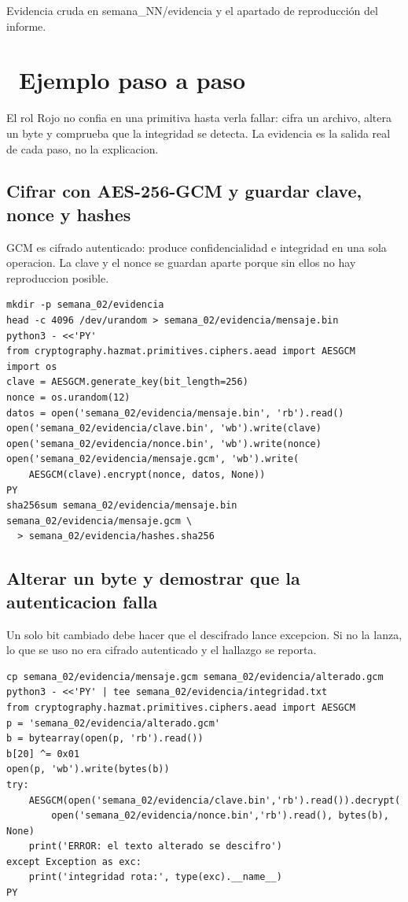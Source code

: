 \documentclass[11pt,a4paper]{article}
\newcommand{\iconotexto}[2]{\textcolor{cyanNeon}{\faIcon{#1}}~#2}
\begin{document}
Evidencia cruda en semana\_NN/evidencia y el apartado de reproducción del informe.

\section{\iconotexto{list-ol}{Ejemplo paso a paso}}

El rol Rojo no confia en una primitiva hasta verla fallar: cifra un archivo, altera un byte y comprueba que la integridad se detecta. La evidencia es la salida real de cada paso, no la explicacion.

\subsection{Cifrar con AES-256-GCM y guardar clave, nonce y hashes}

GCM es cifrado autenticado: produce confidencialidad e integridad en una sola operacion. La clave y el nonce se guardan aparte porque sin ellos no hay reproduccion posible.

\begin{lstlisting}[style=estiloCodigo]
mkdir -p semana_02/evidencia
head -c 4096 /dev/urandom > semana_02/evidencia/mensaje.bin
python3 - <<'PY'
from cryptography.hazmat.primitives.ciphers.aead import AESGCM
import os
clave = AESGCM.generate_key(bit_length=256)
nonce = os.urandom(12)
datos = open('semana_02/evidencia/mensaje.bin', 'rb').read()
open('semana_02/evidencia/clave.bin', 'wb').write(clave)
open('semana_02/evidencia/nonce.bin', 'wb').write(nonce)
open('semana_02/evidencia/mensaje.gcm', 'wb').write(
    AESGCM(clave).encrypt(nonce, datos, None))
PY
sha256sum semana_02/evidencia/mensaje.bin semana_02/evidencia/mensaje.gcm \
  > semana_02/evidencia/hashes.sha256
\end{lstlisting}

\subsection{Alterar un byte y demostrar que la autenticacion falla}

Un solo bit cambiado debe hacer que el descifrado lance excepcion. Si no la lanza, lo que se uso no era cifrado autenticado y el hallazgo se reporta.

\begin{lstlisting}[style=estiloCodigo]
cp semana_02/evidencia/mensaje.gcm semana_02/evidencia/alterado.gcm
python3 - <<'PY' | tee semana_02/evidencia/integridad.txt
from cryptography.hazmat.primitives.ciphers.aead import AESGCM
p = 'semana_02/evidencia/alterado.gcm'
b = bytearray(open(p, 'rb').read())
b[20] ^= 0x01
open(p, 'wb').write(bytes(b))
try:
    AESGCM(open('semana_02/evidencia/clave.bin','rb').read()).decrypt(
        open('semana_02/evidencia/nonce.bin','rb').read(), bytes(b), None)
    print('ERROR: el texto alterado se descifro')
except Exception as exc:
    print('integridad rota:', type(exc).__name__)
PY
\end{lstlisting}
\end{document}
